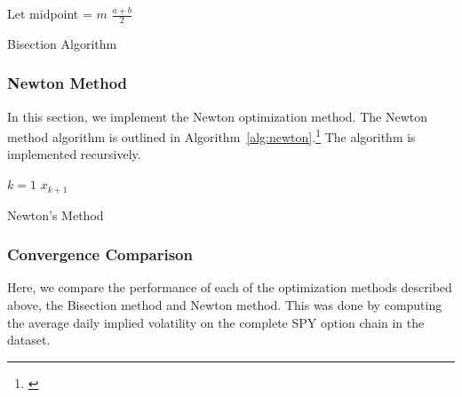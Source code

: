 \documentclass[10pt]{article}
\begin{document}
        \begin{algorithm}[h]
            \SetAlgoNoLine
            Let midpoint = $m$\;
            \Return $\frac{a + b}{2}$\;
            \caption{Bisection Algorithm}
            \label{alg:bisection}
        \end{algorithm}

        
        
        \subsubsection{Newton Method}
        
        In this section, we implement the Newton optimization method. The Newton method algorithm is outlined in Algorithm~\ref{alg:newton}.\footnote{\cite{Stefanica2011}} The algorithm is implemented recursively.
        
        \begin{algorithm}[h]
            \SetAlgoNoLine
            $k = 1$\;
            \Return $x_{k+1}$\;
            \caption{Newton's Method}
            \label{alg:newton}
        \end{algorithm}

        

        \subsubsection{Convergence Comparison}

        Here, we compare the performance of each of the optimization methods described above, the Bisection method and Newton method. This was done by computing the average daily implied volatility on the complete SPY option chain in the dataset.
\end{document}

